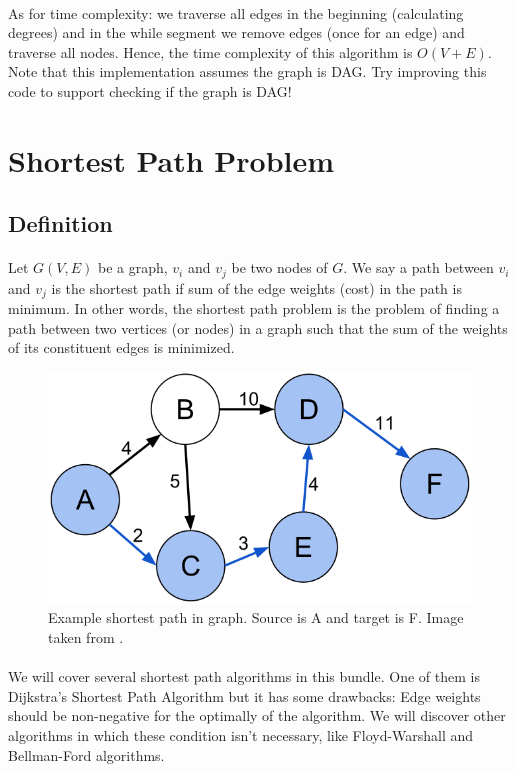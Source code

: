 \documentclass[12pt]{article}
\begin{document}
\paragraph{} As for time complexity: we traverse all edges in the beginning (calculating degrees) and in the while segment we remove edges (once for an edge) and traverse all nodes. Hence, the time complexity of this algorithm is $ O(V+E)$.
Note that this implementation assumes the graph is DAG. Try improving this code to support checking if the graph is DAG!
\section{Shortest Path Problem}
\subsection{Definition}
\paragraph{}
Let $G(V,E)$ be a graph, $v_i$ and $v_j$ be two nodes of $G$. We say a path between  $v_i$ and $v_j$ is the shortest path if sum of the edge weights (cost) in the path is minimum. In other words, the shortest path problem is the problem of finding a path between two vertices (or nodes) in a graph such that the sum of the weights of its constituent edges is minimized. \cite{7} 
\begin{figure}[h!]
\begin{center}
\includegraphics[width=\linewidth/2]{shortest.png}
  \end{center}
\caption{ Example shortest path in graph. Source is A and target is F. Image taken from \cite{7}.}
  \label{fig}
\end{figure}
\paragraph{}We will cover several shortest path algorithms in this bundle. One of them is Dijkstra's Shortest Path Algorithm but it has some drawbacks: Edge weights should be non-negative for the optimally of the algorithm. We will discover other algorithms in which these condition isn't necessary, like Floyd-Warshall and Bellman-Ford algorithms.
\end{document}
